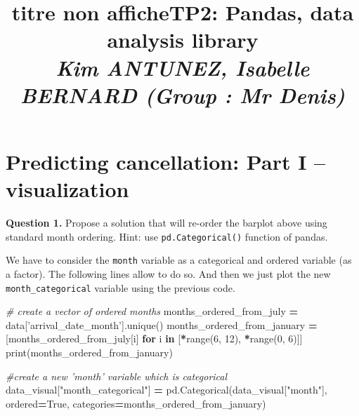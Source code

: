 \documentclass[10pt,a4paper]{article}
\title{titre non affiche}
\author{}
\date{}
\title{\textbf{TP2: Pandas, data analysis library  } \medskip \\ \large \emph{Kim ANTUNEZ, Isabelle BERNARD (Group : Mr Denis)}}
\author{}
\newenvironment{Shaded}{\begin{snugshade}}{\end{snugshade}}
\newcommand{\BuiltInTok}[1]{#1}
\newcommand{\CommentTok}[1]{\textcolor[rgb]{0.56,0.35,0.01}{\textit{#1}}}
\newcommand{\ControlFlowTok}[1]{\textcolor[rgb]{0.13,0.29,0.53}{\textbf{#1}}}
\newcommand{\DecValTok}[1]{\textcolor[rgb]{0.00,0.00,0.81}{#1}}
\newcommand{\KeywordTok}[1]{\textcolor[rgb]{0.13,0.29,0.53}{\textbf{#1}}}
\newcommand{\NormalTok}[1]{#1}
\newcommand{\OperatorTok}[1]{\textcolor[rgb]{0.81,0.36,0.00}{\textbf{#1}}}
\newcommand{\StringTok}[1]{\textcolor[rgb]{0.31,0.60,0.02}{#1}}
\newcommand{\VariableTok}[1]{\textcolor[rgb]{0.00,0.00,0.00}{#1}}
\theoremstyle{break}
\begin{document}
\maketitle


\vspace{-20truemm}

\hypertarget{predicting-cancellation-part-i-visualization}{%
\section{Predicting cancellation: Part I -- visualization}\label{predicting-cancellation-part-i-visualization}}

\begin{tcolorbox}

\textbf{Question 1.} Propose a solution that will re-order the barplot above using standard month ordering. Hint: use \texttt{pd.Categorical()} function of pandas.

\end{tcolorbox}

We have to consider the \texttt{month} variable as a categorical and ordered variable (as a factor). The following lines allow to do so. And then we just plot the new \texttt{month\_categorical} variable using the previous code.

\begin{Shaded}
\begin{Highlighting}[]
\CommentTok{# create a vector of ordered months}
\NormalTok{months_ordered_from_july }\OperatorTok{=}\NormalTok{ data[}\StringTok{'arrival_date_month'}\NormalTok{].unique()}
\NormalTok{months_ordered_from_january }\OperatorTok{=}\NormalTok{ [months_ordered_from_july[i] }\ControlFlowTok{for}\NormalTok{ i }\KeywordTok{in}\NormalTok{ [}\OperatorTok{*}\BuiltInTok{range}\NormalTok{(}\DecValTok{6}\NormalTok{, }\DecValTok{12}\NormalTok{), }\OperatorTok{*}\BuiltInTok{range}\NormalTok{(}\DecValTok{0}\NormalTok{, }\DecValTok{6}\NormalTok{)]]}
\BuiltInTok{print}\NormalTok{(months_ordered_from_january)}

\CommentTok{#create a new 'month' variable which is categorical}
\NormalTok{data_visual[}\StringTok{"month_categorical"}\NormalTok{] }\OperatorTok{=}\NormalTok{ pd.Categorical(data_visual[}\StringTok{"month"}\NormalTok{], ordered}\OperatorTok{=}\VariableTok{True}\NormalTok{,}
\NormalTok{                   categories}\OperatorTok{=}\NormalTok{months_ordered_from_january)}
\end{Highlighting}
\end{Shaded}
\end{document}
